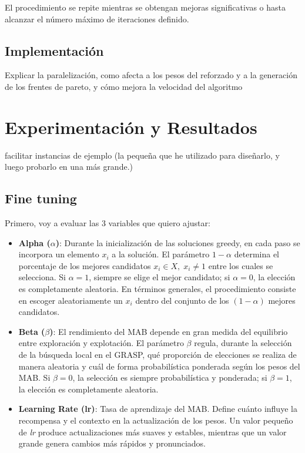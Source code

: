 \documentclass[12pt,a4paper]{book}
\begin{document}
El procedimiento se repite mientras se obtengan mejoras significativas o hasta alcanzar el número máximo de iteraciones definido. 

\section{Implementación}

Explicar la paralelización, como afecta a los pesos del reforzado y a la generación de los frentes de pareto, y cómo mejora la velocidad del algoritmo

\chapter{Experimentación y Resultados}

facilitar instancias de ejemplo (la pequeña que he utilizado para diseñarlo, y luego probarlo en una más grande.)

\section{Fine tuning}

Primero, voy a evaluar las 3 variables que quiero ajustar:
\begin{itemize}
    \item \textbf{Alpha ($\alpha$)}: Durante la inicialización de las soluciones greedy, en cada paso se incorpora un elemento $x_i$ a la solución. El parámetro $1-\alpha$ determina el porcentaje de los mejores candidatos $x_i \in X, \; x_i \neq 1$ entre los cuales se selecciona.  
Si $\alpha = 1$, siempre se elige el mejor candidato; si $\alpha = 0$, la elección es completamente aleatoria. En términos generales, el procedimiento consiste en escoger aleatoriamente un $x_i$ dentro del conjunto de los $(1-\alpha)$ mejores candidatos.
    \item \textbf{Beta ($\beta$)}: El rendimiento del MAB depende en gran medida del equilibrio entre exploración y explotación. El parámetro $\beta$ regula, durante la selección de la búsqueda local en el GRASP, qué proporción de elecciones se realiza de manera aleatoria y cuál de forma probabilística ponderada según los pesos del MAB.  
Si $\beta = 0$, la selección es siempre probabilística y ponderada; si $\beta = 1$, la elección es completamente aleatoria.
    \item \textbf{Learning Rate (lr)}: Tasa de aprendizaje del MAB. Define cuánto influye la recompensa y el contexto en la actualización de los pesos. 
Un valor pequeño de \textit{lr} produce actualizaciones más suaves y estables, mientras que un valor grande genera cambios más rápidos y pronunciados.
\end{itemize}
\end{document}
